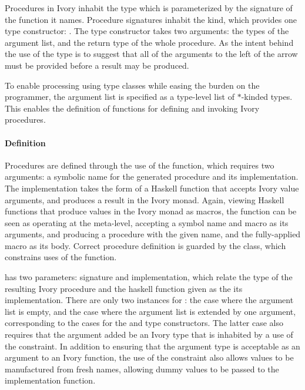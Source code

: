 Procedures in Ivory inhabit the  type which is parameterized by the
signature of the function it names.  Procedure signatures inhabit the 
kind, which provides one type constructor: \cd{:->}.  The \cd{:->} type
constructor takes two arguments: the types of the argument list, and the return
type of the whole procedure.  As the intent behind the use of the \cd{:->} type
is to suggest that all of the arguments to the left of the arrow must be
provided before a result may be produced.

To enable processing using type classes while easing the burden on the
programmer, the argument list is specified as a type-level list of $*$-kinded
types.  This enables the definition of functions for defining and invoking Ivory
procedures.

\paragraph{Definition}

Procedures are defined through the use of the  function, which requires
two arguments: a symbolic name for the generated procedure and its
implementation.  The implementation takes the form of a Haskell function that
accepts Ivory value arguments, and produces a result in the Ivory monad.  Again,
viewing Haskell functions that produce values in the Ivory monad as macros, the
 function can be seen as operating at the meta-level, accepting a
symbol name and macro as its arguments, and producing a procedure with the given
name, and the fully-applied macro as its body.  Correct procedure definition is
guarded by the  class, which constrains uses of the 
function. 

 has two parameters: signature and implementation, which relate
the  type of the resulting Ivory procedure and the haskell function
given as the its implementation.  There are only two instances for
: the case where the argument list is empty, and the case where
the argument list is extended by one argument, corresponding to the cases for
the  and  type constructors.  The latter case also requires
that the argument added be an Ivory type that is inhabited by a use of the
 constraint.  In addition to ensuring that the argument type is
acceptable as an argument to an Ivory function, the use of the 
constraint also allows values to be manufactured from fresh names, allowing
dummy values to be passed to the implementation function.

